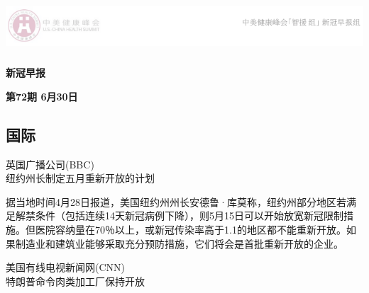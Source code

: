\documentclass[
]{article}
\author{}
\date{\vspace{-2.5em}}
\begin{document}
\fontsize{22}{22}
\selectfont
\vspace{-10truemm}

\newcommand{\resheading}[1]{%
  \noindent\fcolorbox{lavenderblush}{lavenderblush}{\makebox[\dimexpr\textwidth-2\fboxsep-2\fboxrule][c]{\textbf{~#1}}}%
}

\begin{center}
\includegraphics[height=2cm]{./input/logo2.png} 
\end{center}

\begin{center}
\fontsize{45}{45}
\textcolor{glaucous}{\textbf{新冠早报}}
\end{center}

\begin{center}
\fontsize{22}{22}
{\textcolor{glaucous}{\textbf{第72期 \space 6月30日}}}
\end{center}

%
  \noindent{}%

\vspace{-5mm}

\hypertarget{section}{%
\subsection{\texorpdfstring{\textcolor{glaucous}{\Huge 国际}}{}}\label{section}}

\vspace{-3mm}

\begin{center}
\textcolor{glaucous}{英国广播公司(BBC)}\\纽约州长制定五月重新开放的计划

\end{center}

据当地时间4月28日报道，美国纽约州州长安德鲁·库莫称，纽约州部分地区若满足解禁条件（包括连续14天新冠病例下降），则5月15日可以开始放宽新冠限制措施。但医院容纳量在70％以上，或新冠传染率高于1.1的地区都不能重新开放。如果制造业和建筑业能够采取充分预防措施，它们将会是首批重新开放的企业。

\begin{center}
\textcolor{glaucous}{美国有线电视新闻网(CNN)}\\特朗普命令肉类加工厂保持开放
\end{center}
\end{document}
